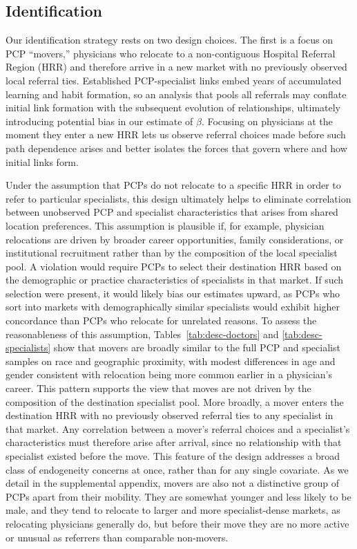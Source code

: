 \documentclass[12pt]{article}
\begin{document}
\subsection{Identification}
\label{sec:identification}

Our identification strategy rests on two design choices. The first is a focus on PCP ``movers,'' physicians who relocate to a non-contiguous Hospital Referral Region (HRR) and therefore arrive in a new market with no previously observed local referral ties. Established PCP-specialist links embed years of accumulated learning and habit formation, so an analysis that pools all referrals may conflate initial link formation with the subsequent evolution of relationships, ultimately introducing potential bias in our estimate of $\beta$. Focusing on physicians at the moment they enter a new HRR lets us observe referral choices made before such path dependence arises and better isolates the forces that govern where and how initial links form.

Under the assumption that PCPs do not relocate to a specific HRR in order to refer to particular specialists, this design ultimately helps to eliminate correlation between unobserved PCP and specialist characteristics that arises from shared location preferences. This assumption is plausible if, for example, physician relocations are driven by broader career opportunities, family considerations, or institutional recruitment rather than by the composition of the local specialist pool. A violation would require PCPs to select their destination HRR based on the demographic or practice characteristics of specialists in that market. If such selection were present, it would likely bias our estimates upward, as PCPs who sort into markets with demographically similar specialists would exhibit higher concordance than PCPs who relocate for unrelated reasons. To assess the reasonableness of this assumption, Tables~\ref{tab:desc-doctors} and \ref{tab:desc-specialists} show that movers are broadly similar to the full PCP and specialist samples on race and geographic proximity, with modest differences in age and gender consistent with relocation being more common earlier in a physician's career. This pattern supports the view that moves are not driven by the composition of the destination specialist pool. More broadly, a mover enters the destination HRR with no previously observed referral ties to any specialist in that market. Any correlation between a mover's referral choices and a specialist's characteristics must therefore arise after arrival, since no relationship with that specialist existed before the move. This feature of the design addresses a broad class of endogeneity concerns at once, rather than for any single covariate. As we detail in the supplemental appendix, movers are also not a distinctive group of PCPs apart from their mobility. They are somewhat younger and less likely to be male, and they tend to relocate to larger and more specialist-dense markets, as relocating physicians generally do, but before their move they are no more active or unusual as referrers than comparable non-movers.
\end{document}
